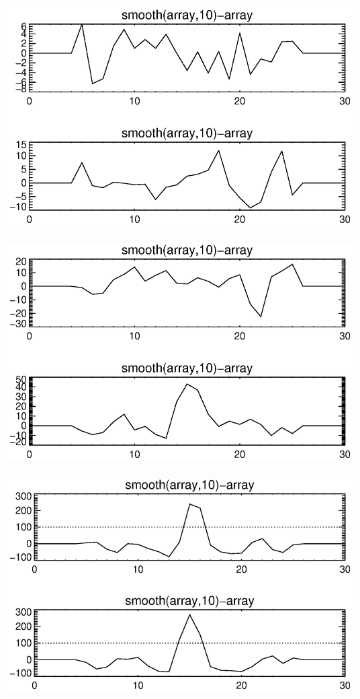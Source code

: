 \documentclass[10pt]{scrartcl}
\begin{document}
\begin{figure}[!ht]
    \vspace{-0.5in}
    \begin{subfigure}[b]{.3\linewidth}
        \centering
        \includegraphics[width=1.0\linewidth]{../plots_tables_images/1d1dsums_0_0.eps}
    \end{subfigure}
    \begin{subfigure}[b]{.3\linewidth}
        \centering
        \includegraphics[width=1.0\linewidth]{../plots_tables_images/1d1dsums_0_1.eps}
    \end{subfigure}
    \begin{subfigure}[b]{.3\linewidth}
        \centering
        \includegraphics[width=1.0\linewidth]{../plots_tables_images/1d1dsums_0_4.eps}

\end{subfigure}
\end{figure}
\end{document}
